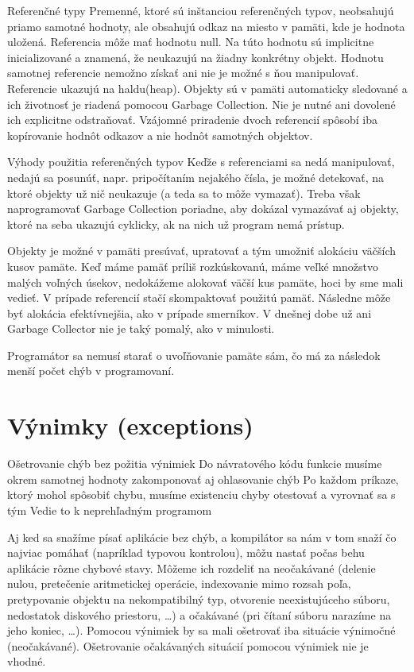 Referenčné typy
Premenné, ktoré sú inštanciou referenčných typov, neobsahujú priamo samotné hodnoty, ale obsahujú odkaz na miesto v pamäti, kde je hodnota uložená. Referencia môže mať hodnotu null. Na túto hodnotu sú implicitne inicializované a znamená, že neukazujú na žiadny konkrétny objekt. Hodnotu samotnej referencie nemožno získať ani nie je možné s ňou manipulovať. Referencie ukazujú na haldu(heap). Objekty sú v pamäti automaticky sledované a ich životnosť je riadená pomocou Garbage Collection. Nie je nutné ani dovolené ich explicitne odstraňovať. Vzájomné priradenie dvoch referencií spôsobí iba kopírovanie hodnôt odkazov a nie hodnôt samotných objektov.


Výhody použitia referenčných typov
Keďže s referenciami sa nedá manipulovať, nedajú sa posunúť, napr. pripočítaním nejakého čísla, je možné detekovať, na ktoré objekty už nič neukazuje (a teda sa to môže vymazať). Treba však naprogramovať Garbage Collection poriadne, aby dokázal vymazávať aj objekty, ktoré na seba ukazujú cyklicky, ak na nich už program nemá prístup.

Objekty je možné v pamäti presúvať, upratovať a tým umožniť alokáciu väčších kusov pamäte. Keď máme pamäť príliš rozkúskovanú, máme veľké množstvo malých voľných úsekov, nedokážeme alokovať väčší kus pamäte, hoci by sme mali vedieť. V prípade referencií stačí skompaktovať použitú pamäť. Následne môže byť alokácia efektívnejšia, ako v prípade smerníkov. V dnešnej dobe už ani Garbage Collector nie je taký pomalý, ako v minulosti.

Programátor sa nemusí starať o uvoľňovanie pamäte sám, čo má za následok menší počet chýb v programovaní.











\section{Výnimky (exceptions)}

	Ošetrovanie chýb bez požitia výnimiek
	Do návratového kódu funkcie musíme okrem samotnej hodnoty zakomponovať aj ohlasovanie chýb
	Po každom príkaze, ktorý mohol spôsobiť chybu, musíme existenciu chyby otestovať a vyrovnať sa s tým
	Vedie to k neprehľadným programom

Aj ked sa snažíme písať aplikácie bez chýb, a kompilátor sa nám v tom snaží čo najviac pomáhať (napríklad typovou kontrolou), môžu nastať počas behu aplikácie rôzne chybové stavy. Môžeme ich rozdeliť na neočakávané (delenie nulou, pretečenie aritmetickej operácie, indexovanie mimo rozsah poľa, pretypovanie objektu na nekompatibilný typ, otvorenie neexistujúceho súboru, nedostatok diskového priestoru, …) a očakávané (pri čítaní súboru narazíme na jeho koniec, …). Pomocou výnimiek by sa mali ošetrovať iba situácie výnimočné (neočakávané). Ošetrovanie očakávaných situácií pomocou výnimiek nie je vhodné.



